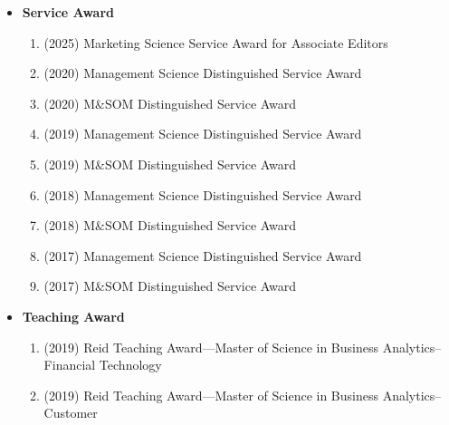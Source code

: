 \documentclass[10pt]{article}
\renewcommand{\section}[1]{\pagebreak[3]%
    \hyphenpenalty=10000%
    \vspace{1.3\baselineskip}%
    \phantomsection\addcontentsline{toc}{section}{#1}%
    \noindent\llap{\scshape\smash{\parbox[t]{\marginparwidth}{\raggedright #1}}}%
    \vspace{-\baselineskip}\par}
\newenvironment{outerlist}[1][\enskip\textbullet]%
        {\begin{itemize}[#1,leftmargin=*]}{\end{itemize}%
         \vspace{-.6\baselineskip}}
\begin{document}
\begin{outerlist}
\begin{enumerate}
    \item (2017) Winner, 2017 Behavioral Operations Management Best Working Paper Award: 
    
    {\footnotesize `` Reducing Discrimination with Reviews in the Sharing Economy:  Evidence from Field Experiments on Airbnb."}
    
    \item (2014) Winner, 2014 POMS College of Healthcare Operations Management Best Paper Award: 
    
    {\footnotesize ``Hospital Readmission Reduction Program: An Economic and Operational Analysis."}
    \end{enumerate}
    \item {\bf Service Award}
    \begin{enumerate}
        \item (2025) Marketing Science Service Award for Associate Editors
        \item (2020) Management Science Distinguished Service Award
        \item (2020) M\&SOM Distinguished Service Award
        \item (2019) Management Science Distinguished Service Award
        \item (2019) M\&SOM Distinguished Service Award
        \item (2018) Management Science Distinguished Service Award
        \item (2018) M\&SOM Distinguished Service Award
        \item (2017) Management Science Distinguished Service Award
        \item (2017) M\&SOM Distinguished Service Award
    \end{enumerate}
    
    \item {\bf Teaching Award}
    \begin{enumerate}
        \item (2019) Reid Teaching Award---Master of Science in Business Analytics–Financial Technology
        \item (2019) Reid Teaching Award---Master of Science in Business Analytics–Customer
    \end{enumerate}
\end{outerlist}

    
\end{document}

